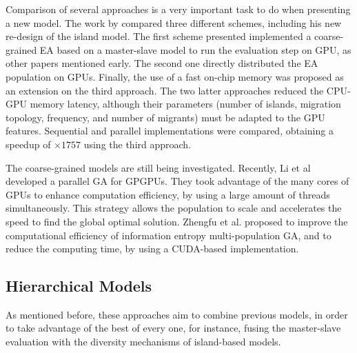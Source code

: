 \documentclass{article}
\begin{document}
Comparison of several approaches is a very important task to do when presenting a new model. The work by \cite{LUONG:2010:INRIA-00520464:1} compared three different schemes, including his new re-design of the island model. The first scheme presented implemented a coarse-grained EA based on a master-slave model to run the evaluation step on GPU, as other papers mentioned early. The second one directly distributed the EA population on GPUs. Finally, the use of a fast on-chip memory was proposed as an extension on the third approach. 
The two latter approaches reduced the CPU-GPU memory latency, although their parameters (number of islands, migration topology, frequency, and number of migrants) must be adapted to the GPU features. Sequential and parallel implementations were compared, obtaining a speedup of $\times1757$ using the third approach.


The coarse-grained models are still being investigated. Recently, Li et al \cite{Li2016} developed a parallel GA for GPGPUs. They took advantage of the many cores of GPUs to enhance computation efficiency, by using a large amount of threads simultaneously. This strategy allows the population to scale and accelerates the speed to find the global optimal solution. Zhengfu et al. \cite{Zhengfu2016} proposed to improve the computational efficiency of information entropy multi-population GA, and to reduce the computing time, by using a CUDA-based implementation.


\subsection{Hierarchical Models}

As mentioned before, these approaches aim to combine previous models, in order to take advantage of the best of every one, for instance, fusing the master-slave evaluation with the diversity mechanisms of island-based models.
\end{document}
